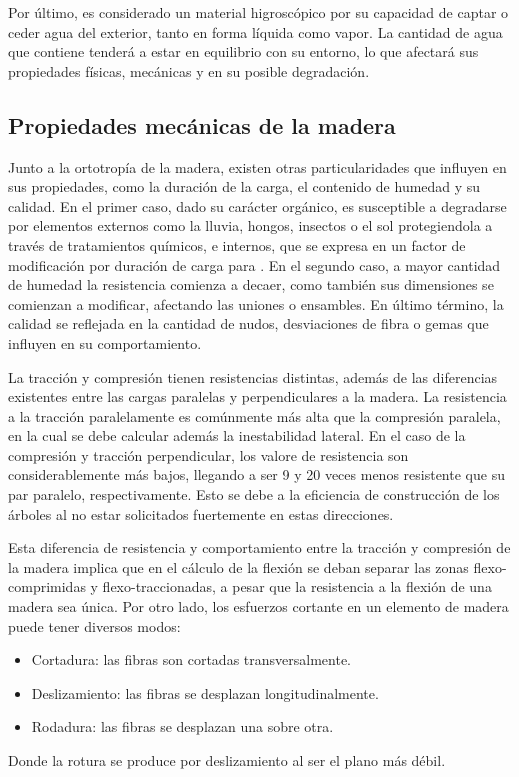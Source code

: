 Por último, es considerado un material higroscópico por su capacidad de captar o ceder agua del exterior, tanto en forma líquida como vapor. La cantidad de agua que contiene tenderá a estar en equilibrio con su entorno, lo que afectará sus propiedades físicas, mecánicas y en su posible degradación.

\subsection{Propiedades mecánicas de la madera}
Junto a la ortotropía de la madera, existen otras particularidades que influyen en sus propiedades, como la duración de la carga, el contenido de humedad y su calidad. En el primer caso, dado su carácter orgánico, es susceptible a degradarse por elementos externos como la lluvia, hongos, insectos o el sol protegiendola a través de tratamientos químicos, e internos, que se expresa en un factor de modificación por duración de carga para . En el segundo caso, a mayor cantidad de humedad la resistencia comienza a decaer, como también sus dimensiones se comienzan a modificar, afectando las uniones o ensambles. En último término, la calidad se reflejada en la cantidad de nudos, desviaciones de fibra o gemas que influyen en su comportamiento.

La tracción y compresión tienen resistencias distintas, además de las diferencias existentes entre las cargas paralelas y perpendiculares a la madera. La resistencia a la tracción paralelamente es comúnmente más alta que la compresión paralela, en la cual se debe calcular además la inestabilidad lateral. En el caso de la compresión y tracción perpendicular, los valore de resistencia son considerablemente más bajos, llegando a ser 9 y 20 veces menos resistente que su par paralelo, respectivamente. Esto se debe a la eficiencia de construcción de los árboles al no estar solicitados fuertemente en estas direcciones. 

Esta diferencia de resistencia y comportamiento entre la tracción y compresión de la madera implica que en el cálculo de la flexión se deban separar las zonas flexo-comprimidas y flexo-traccionadas, a pesar que la resistencia a la flexión de una madera sea única. Por otro lado, los esfuerzos cortante en un elemento de madera puede tener diversos modos:
\begin{itemize}
	\item Cortadura: las fibras son cortadas transversalmente.
	\item Deslizamiento: las fibras se desplazan longitudinalmente.
	\item Rodadura: las fibras se desplazan una sobre otra.
\end{itemize}
Donde la rotura se produce por deslizamiento al ser el plano más débil.

